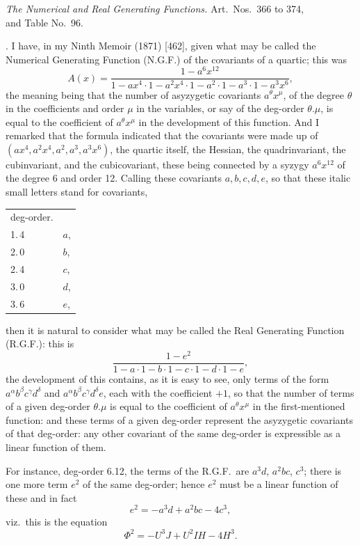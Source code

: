 \documentclass[11pt]{article}
\begin{document}
\begin{center}
\textit{The Numerical and Real Generating Functions.} Art.\ Nos.\ 366 to 374,\\
and Table No.\ 96.
\end{center}

\medskip

. I have, in my Ninth Memoir (1871) [462], given what may be called the Numerical Generating Function (N.G.F.) of the covariants of a quartic; this was
\[
A(x) = \frac{1 - a^{6}x^{12}}{1 - ax^{4}\cdot 1 - a^{2}x^{4}\cdot 1 - a^{2}\cdot 1 - a^{3}\cdot 1 - a^{3}x^{6}},
\]
the meaning being that the number of asyzygetic covariants $a^{\theta}x^{\mu}$, of the degree $\theta$ in the coefficients and order $\mu$ in the variables, or say of the deg-order $\theta.\mu$, is equal to the coefficient of $a^{\theta}x^{\mu}$ in the development of this function. And I remarked that the formula indicated that the covariants were made up of $(ax^{4}, a^{2}x^{4}, a^{2}, a^{3}, a^{3}x^{6})$, the quartic itself, the Hessian, the quadrinvariant, the cubinvariant, and the cubicovariant, these being connected by a syzygy $a^{6}x^{12}$ of the degree 6 and order 12. Calling these covariants $a, b, c, d, e$, so that these italic small letters stand for covariants,
\begin{center}
\begin{tabular}{ll}
deg-order. & \\
1.\,4 & $a$,\\
2.\,0 & $b$,\\
2.\,4 & $c$,\\
3.\,0 & $d$,\\
3.\,6 & $e$,\\
\end{tabular}
\end{center}
then it is natural to consider what may be called the Real Generating Function (R.G.F.): this is
\[
\frac{1 - e^{2}}{1 - a\cdot 1 - b\cdot 1 - c\cdot 1 - d\cdot 1 - e},
\]
the development of this contains, as it is easy to see, only terms of the form $a^{\alpha}b^{\beta}c^{\gamma}d^{\delta}$ and $a^{\alpha}b^{\beta}c^{\gamma}d^{\delta}e$, each with the coefficient $+1$, so that the number of terms of a given deg-order $\theta.\mu$ is equal to the coefficient of $a^{\theta}x^{\mu}$ in the first-mentioned function: and these terms of a given deg-order represent the asyzygetic covariants of that deg-order: any other covariant of the same deg-order is expressible as a linear function of them.

For instance, deg-order 6.12, the terms of the R.G.F.\ are $a^{3}d$, $a^{2}bc$, $c^{3}$; there is one more term $e^{2}$ of the same deg-order; hence $e^{2}$ must be a linear function of these and in fact
\[
e^{2} = -a^{3}d + a^{2}bc - 4c^{3},
\]
viz.\ this is the equation
\[
\Phi^{2} = -U^{3}J + U^{2}IH - 4H^{3}.
\]
\end{document}
